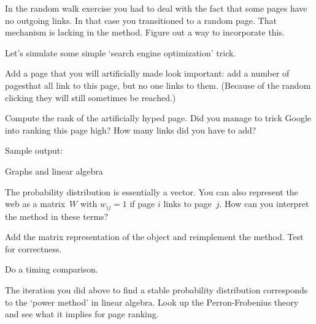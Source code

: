 \begin{exercise}
  In the random walk exercise you had to deal with the fact that some
  pages have no outgoing links. In that case you transitioned to a
  random page. That mechanism is lacking in the 
  method. Figure out a way to incorporate this.
\end{exercise}

Let's simulate some simple `search engine optimization' trick.

\begin{exercise}
  Add a page that you will artificially made look important: add a
  number of pagesthat all link to this page, but no one links to
  them. (Because of the random clicking they will still sometimes be
  reached.)

  Compute the rank of the artificially hyped page.
  Did you manage to trick Google into ranking this page high?
  How many links did you have to add?

  Sample output:
  
\end{exercise}

 {Graphs and linear algebra}

The probability distribution is essentially a vector. You can also
represent the web as a matrix~$W$ with $w_{ij}=1$ if page $i$
links to page~$j$. How can you interpret the  method in
these terms?

\begin{exercise}
  Add the matrix representation of the  object and reimplement
  the  method. Test for correctness.

  Do a timing comparison.
\end{exercise}

The iteration you did above to find a stable probability distribution
corresponds to the `power method' in linear algebra. Look up the
Perron-Frobenius theory and see what it implies for page ranking.

